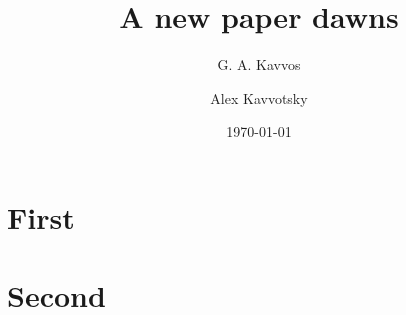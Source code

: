 \documentclass[a4paper]{scrartcl}
\title{A new paper dawns}
\author{G. A. Kavvos \and Alex Kavvotsky}
\date{\today}
\begin{document}
\maketitle

\begin{abstract}
  \lipsum[1]
\end{abstract}


\section{First}
  \lipsum[1]

\section{Second}
  \lipsum[2] \parencite{qian2021}

\printbibliography
\end{document}
